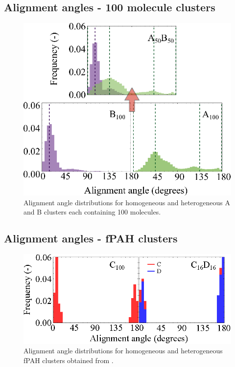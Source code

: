 \subsection{Alignment angles - 100 molecule clusters}
%
\begin{figure}[!tbh]
\centering
\includegraphics[width=0.8\linewidth]{Figures/alignment_angles_heteroSI.eps}
\caption{Alignment angle distributions for homogeneous and heterogeneous A and B clusters each containing 100 molecules.}
\label{figSI:alignmentangles_100}
\end{figure}
%

\subsection{Alignment angles - fPAH clusters}
%
\begin{figure}[!tbh]
\centering
\includegraphics[width=0.7\linewidth]{Figures/alignment_angles_fPAHs.eps}
\caption{Alignment angle distributions for homogeneous and heterogeneous fPAH clusters obtained from \citet{bowal2018partitioning}.}
\label{figSI:alignmentangles_fPAHs}
\end{figure}
%

